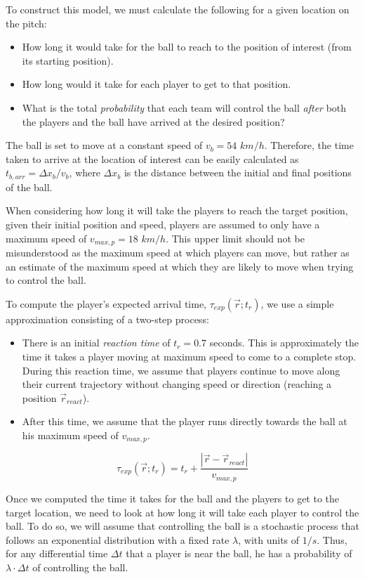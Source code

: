 \documentclass[twoside,nohyper]{tufte-book}
\begin{document}
To construct this model, we must calculate the following for a given
location on the pitch:

\begin{itemize}
\item
  How long it would take for the ball to reach to the position of
  interest (from its starting position).
\item
  How long would it take for each player to get to that position.
\item
  What is the total \emph{probability} that each team will control the ball
  \emph{after} both the players and the ball have arrived at the desired
  position?
\end{itemize}

The ball is set to move at a constant speed of \(v_b = 54\) \(km/h\).
Therefore, the time taken to arrive at the location of interest can be
easily calculated as \(t_{b,arr} = \Delta x_b/v_b\), where \(\Delta x_b\) is
the distance between the initial and final positions of the ball.

When considering how long it will take the players to reach the target
position, given their initial position and speed, players are assumed to
only have a maximum speed of \(v_{max,p} = 18\) \(km/h\). This upper limit
should not be misunderstood as the maximum speed at which players can
move, but rather as an estimate of the maximum speed at which they are
likely to move when trying to control the ball.

To compute the player's expected arrival time,
\(\tau_{exp}(\vec{r} ; t_r)\), we use a simple approximation consisting of
a two-step process:

\begin{itemize}
\item
  There is an initial \emph{reaction time} of \(t_{r} = 0.7\) seconds. This
  is approximately the time it takes a player moving at maximum speed
  to come to a complete stop. During this reaction time, we assume
  that players continue to move along their current trajectory without
  changing speed or direction (reaching a position \(\vec{r}_{react}\)).
\item
  After this time, we assume that the player runs directly towards the
  ball at his maximum speed of \(v_{max,p}\).
\end{itemize}

\[\tau_{exp}(\vec{r} ; t_r) = t_r + \frac{|\vec{r} - \vec{r}_{react}|}{v_{max,p}}
    \label{exp_arr_time}\]

Once we computed the time it takes for the ball and the players to get
to the target location, we need to look at how long it will take each
player to control the ball. To do so, we will assume that controlling
the ball is a stochastic process that follows an exponential
distribution with a fixed rate \(\lambda\), with units of \(1/s\). Thus, for
any differential time \(\Delta t\) that a player is near the ball, he has
a probability of \(\lambda \cdot \Delta t\) of controlling the ball.
\end{document}
